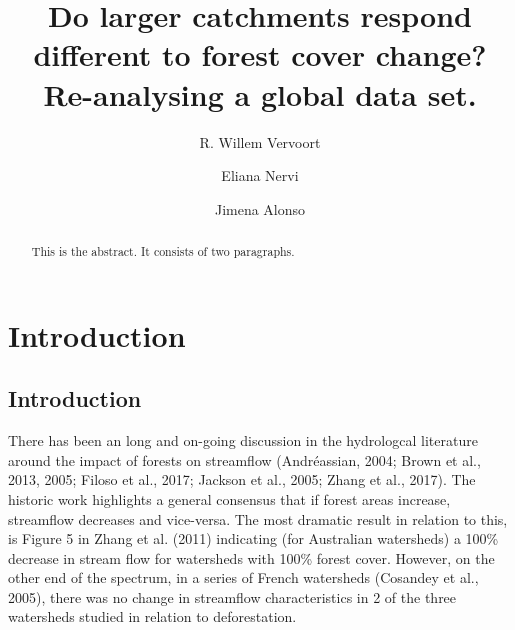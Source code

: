 \documentclass[]{elsarticle} %
\begin{document}
\begin{frontmatter}

  \title{Do larger catchments respond different to forest cover change?
Re-analysing a global data set.}
    \author[The University of Sydney, INIA]{R. Willem Vervoort}
    \author[INIA]{Eliana Nervi}
    \author[IMFIA]{Jimena Alonso}
      \address[The University of Sydney]{School of Life and Environmental Sciences, The University of Sydney,
Sydney, NSW 2006, Australia}
    \address[INIA]{INIA, Uruguay}
    \address[IMFIA]{Institute of Fluid Mechanics and Environmental Engineering, School of
Engineering, Universidad de la República, 11200 Montevideo, Departamento
de Montevideo, Uruguay}
  
  \begin{abstract}
  This is the abstract. It consists of two paragraphs.
  \end{abstract}
  
 \end{frontmatter}

\hypertarget{introduction}{%
\section{Introduction}\label{introduction}}

\hypertarget{introduction-1}{%
\subsection{Introduction}\label{introduction-1}}

There has been an long and on-going discussion in the hydrologcal
literature around the impact of forests on streamflow (Andréassian,
2004; Brown et al., 2013, 2005; Filoso et al., 2017; Jackson et al.,
2005; Zhang et al., 2017). The historic work highlights a general
consensus that if forest areas increase, streamflow decreases and
vice-versa. The most dramatic result in relation to this, is Figure 5 in
Zhang et al. (2011) indicating (for Australian watersheds) a 100\%
decrease in stream flow for watersheds with 100\% forest cover. However,
on the other end of the spectrum, in a series of French watersheds
(Cosandey et al., 2005), there was no change in streamflow
characteristics in 2 of the three watersheds studied in relation to
deforestation.
\end{document}
